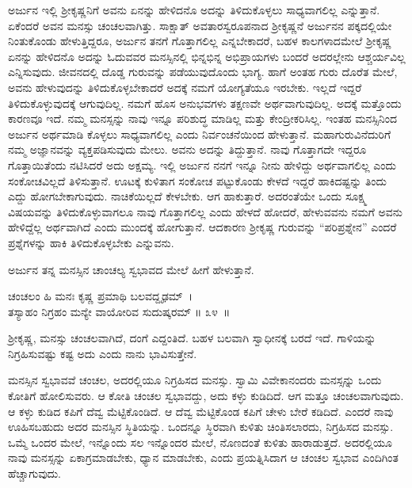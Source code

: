 ಅರ್ಜುನ ಇಲ್ಲಿ ಶ‍್ರೀಕೃಷ್ಣನಿಗೆ ಅವನು ಏನನ್ನು ಹೇಳಿದನೊ ಅದನ್ನು ತಿಳಿದುಕೊಳ್ಳಲು ಸಾಧ್ಯವಾಗಲಿಲ್ಲ ಎನ್ನುತ್ತಾನೆ. ಏಕೆಂದರೆ ಅವನ ಮನಸ್ಸು ಚಂಚಲವಾಗಿತ್ತು. ಸಾಕ್ಷಾತ್ ಅವತಾರ\-ಸ್ವರೂಪನಾದ ಶ‍್ರೀಕೃಷ್ಣನೆ ಅರ್ಜುನನ ಪಕ್ಕದಲ್ಲಿಯೇ ನಿಂತುಕೊಂಡು ಹೇಳುತ್ತಿದ್ದರೂ, ಅರ್ಜುನ ತನಗೆ ಗೊತ್ತಾಗಲಿಲ್ಲ ಎನ್ನಬೇಕಾದರೆ, ಬಹಳ ಕಾಲಗಳಾದಮೇಲೆ ಶ‍್ರೀಕೃಷ್ಣ ಏನನ್ನು ಹೇಳಿದನೊ ಅದನ್ನು ಓದುವವರ ಮನಸ್ಸಿನಲ್ಲಿ ಭಿನ್ನಭಿನ್ನ ಅಭಿಪ್ರಾಯಗಳು ಬಂದರೆ ಅದರಲ್ಲೇನು ಆಶ್ಚರ್ಯವಿಲ್ಲ ಎನ್ನಿಸುವುದು. ಜೀವನದಲ್ಲಿ ದೊಡ್ಡ ಗುರುವನ್ನು ಪಡೆಯುವುದೊಂದು ಭಾಗ್ಯ. ಹಾಗೆ ಅಂತಹ ಗುರು ದೊರೆತ ಮೇಲೆ, ಅವನು ಹೇಳುವುದನ್ನು ತಿಳಿದುಕೊಳ್ಳಬೇಕಾದರೆ ಅದಕ್ಕೆ ನಮಗೆ ಯೋಗ್ಯತೆಯೂ ಇರಬೇಕು. ಇಲ್ಲದೆ ಇದ್ದರೆ ತಿಳಿದುಕೊಳ್ಳುವುದಕ್ಕೆ ಆಗುವುದಿಲ್ಲ. ನಮಗೆ ಹೊಸ ಅನುಭವಗಳು ತಕ್ಷಣವೇ ಅರ್ಥವಾಗುವುದಿಲ್ಲ. ಅದಕ್ಕೆ ಮತ್ತೊಂದು ಕಾರಣವೂ ಇದೆ. ನಮ್ಮ ಮನಸ್ಸನ್ನು ನಾವು ಇನ್ನೂ ಪರಿಶುದ್ಧ ಮಾಡಿಲ್ಲ ಮತ್ತು ಕೇಂದ್ರೀಕರಿಸಿಲ್ಲ. ಇಂತಹ ಮನಸ್ಸಿನಿಂದ ಅರ್ಜುನ ಅರ್ಥಮಾಡಿ ಕೊಳ್ಳಲು ಸಾಧ್ಯವಾಗಲಿಲ್ಲ ಎಂದು ನಿರ್ವಂಚನೆಯಿಂದ ಹೇಳುತ್ತಾನೆ. ಮಹಾಗುರುವಿನೆದುರಿಗೆ ನಮ್ಮ ಅಜ್ಞಾನವನ್ನು ವ್ಯಕ್ತಪಡಿಸುವುದು ಮೇಲು. ಅವನು ಅದನ್ನು ತಿದ್ದುತ್ತಾನೆ. ನಾವು ಗೊತ್ತಾಗದೇ ಇದ್ದರೂ ಗೊತ್ತಾಯಿತೆಂದು ನಟಿಸಿದರೆ ಅದು ಅಕ್ಷಮ್ಯ. ಇಲ್ಲಿ ಅರ್ಜುನ ನನಗೆ ಇನ್ನೂ ನೀನು ಹೇಳಿದ್ದು ಅರ್ಥವಾಗಲಿಲ್ಲ ಎಂದು ಸಂಕೋಚವಿಲ್ಲದೆ ತಿಳಿಸುತ್ತಾನೆ. ಊಟಕ್ಕೆ ಕುಳಿತಾಗ ಸಂಕೋಚ ಪಟ್ಟುಕೊಂಡು ಕೇಳದೆ ಇದ್ದರೆ ಹಾಕಿದಷ್ಟನ್ನು ತಿಂದು ಎದ್ದು ಹೋಗಬೇಕಾಗುವುದು. ನಾಚಿಕೆಯಿಲ್ಲದೆ ಕೇಳಬೇಕು. ಆಗ ಹಾಕುತ್ತಾರೆ. ಅದರಂತೆಯೇ ಒಂದು ಸೂಕ್ಷ್ಮ ವಿಷಯವನ್ನು ತಿಳಿದುಕೊಳ್ಳುವಾಗಲೂ ನಾವು ಗೊತ್ತಾಗಲಿಲ್ಲ ಎಂದು ಹೇಳದೆ ಹೋದರೆ, ಹೇಳುವವನು ನಮಗೆ ಅವನು ಹೇಳಿದ್ದೆಲ್ಲ ಅರ್ಥವಾಗಿದೆ ಎಂದು ಮುಂದಕ್ಕೆ ಹೋಗುತ್ತಾನೆ. ಆದಕಾರಣ ಶ‍್ರೀಕೃಷ್ಣ ಗುರುವನ್ನು “ಪರಿಪ್ರಶ್ನೇನ” ಎಂದರೆ ಪ್ರಶ್ನೆಗಳನ್ನು ಹಾಕಿ ತಿಳಿದುಕೊಳ್ಳಬೇಕು ಎನ್ನುವನು.

ಅರ್ಜುನ ತನ್ನ ಮನಸ್ಸಿನ ಚಾಂಚಲ್ಯ ಸ್ವಭಾವದ ಮೇಲೆ ಹೀಗೆ ಹೇಳುತ್ತಾನೆ.

\begin{shloka}
ಚಂಚಲಂ ಹಿ ಮನಃ ಕೃಷ್ಣ ಪ್ರಮಾಥಿ ಬಲವದ್ದೃಢಮ್~।\\ತಸ್ಯಾಹಂ ನಿಗ್ರಹಂ ಮನ್ಯೇ ವಾಯೋರಿವ ಸುದುಷ್ಕರಮ್ \hfill॥ ೩೪~॥
\end{shloka}

\begin{artha}
ಶ‍್ರೀಕೃಷ್ಣ, ಮನಸ್ಸು ಚಂಚಲವಾಗಿದೆ, ದಂಗೆ ಎದ್ದಂತಿದೆ. ಬಹಳ ಬಲವಾಗಿ ಸ್ವಾಧೀನಕ್ಕೆ ಬರದೆ ಇದೆ. ಗಾಳಿಯನ್ನು ನಿಗ್ರಹಿಸುವಷ್ಟು ಕಷ್ಟ ಅದು ಎಂದು ನಾನು ಭಾವಿಸುತ್ತೇನೆ.
\end{artha}

ಮನಸ್ಸಿನ ಸ್ವಭಾವವೆ ಚಂಚಲ, ಅದರಲ್ಲಿಯೂ ನಿಗ್ರಹಿಸದ ಮನಸ್ಸು. ಸ್ವಾಮಿ ವಿವೇಕಾನಂದರು ಮನಸ್ಸನ್ನು ಒಂದು ಕೋತಿಗೆ ಹೋಲಿಸುವರು. ಆ ಕೋತಿ ಚಂಚಲ ಸ್ವಭಾವದ್ದು, ಅದು ಕಳ್ಳು ಕುಡಿದಿದೆ. ಆಗ ಮತ್ತೂ ಚಂಚಲವಾಗುವುದು. ಆ ಕಳ್ಳು ಕುಡಿದ ಕಪಿಗೆ ದೆವ್ವ ಮೆಟ್ಟಿಕೊಂಡಿದೆ. ಆ ದೆವ್ವ ಮೆಟ್ಟಿಕೊಂಡ ಕಪಿಗೆ ಚೇಳು ಬೇರೆ ಕಡಿದಿದೆ. ಎಂದರೆ ನಾವು ಊಹಿಸಬಹುದು ಅದರ ಮನಸ್ಸಿನ ಸ್ಥಿತಿಯನ್ನು. ಒಂದನ್ನೂ ಸ್ಥಿರವಾಗಿ ಕುಳಿತು ಚಿಂತಿಸಲಾರದು, ನಿಗ್ರಹಿಸದ ಮನಸ್ಸು. ಒಮ್ಮೆ ಒಂದರ ಮೇಲೆ, ಇನ್ನೊಂದು ಸಲ ಇನ್ನೊಂದರ ಮೇಲೆ, ನೊಣದಂತೆ ಕುಳಿತು ಹಾರಾಡುತ್ತದೆ. ಅದರಲ್ಲಿಯೂ ನಾವು ಮನಸ್ಸನ್ನು ಏಕಾಗ್ರಮಾಡಬೇಕು, ಧ್ಯಾನ ಮಾಡಬೇಕು, ಎಂದು ಪ್ರಯತ್ನಿಸಿದಾಗ ಆ ಚಂಚಲ ಸ್ವಭಾವ ಎಂದಿಗಿಂತ ಹೆಚ್ಚಾಗುವುದು.

